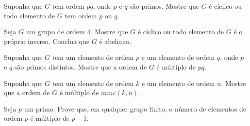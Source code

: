\begin{exercise}
	Suponha que $G$ tem ordem $pq$, onde $p$ e $q$ são primos.
	Mostre que $G$ é cíclico ou todo elemento de $G$ tem ordem $p$ ou $q$.
\end{exercise}

\begin{exercise}
	Seja $G$ um grupo de ordem $4$.
	Mostre que $G$ é cíclico ou todo elemento de $G$ é o próprio inverso.
	Conclua que $G$ é abeliano.
\end{exercise}

\begin{exercise}
	Suponha que $G$ tem um elemento de ordem $p$ e um elemento de ordem $q$, onde $p$ e $q$ são primos distintos. Mostre que a ordem de $G$ é múltiplo de $pq$.
\end{exercise}

\begin{exercise}
	Suponha que $G$ tem um elemento de ordem $k$ e um elemento de ordem $n$. Mostre que a ordem de $G$ é múltiplo de $mmc(k, n)$.
\end{exercise}

\begin{exercise}
	Seja $p$ um primo. Prove que, em qualquer grupo finito, o número de elementos de ordem $p$ é múltiplo de $p-1$.
\end{exercise}
